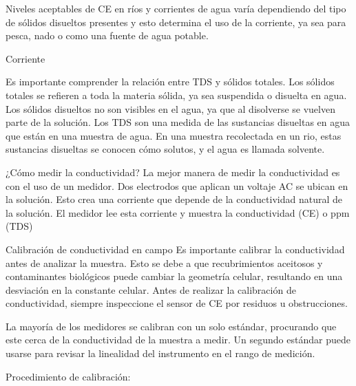 Niveles aceptables de CE en ríos y corrientes de agua varía dependiendo del tipo de sólidos disueltos presentes y esto determina el uso de la corriente, ya sea para pesca, nado o como una fuente de agua potable.


Corriente


Es importante comprender la relación entre TDS y sólidos totales. Los sólidos totales se refieren a toda la materia sólida, ya sea suspendida o disuelta en agua. Los sólidos disueltos no son visibles en el agua, ya que al disolverse se vuelven parte de la solución. Los TDS son una medida de las sustancias disueltas en agua que están en una muestra de agua. En una muestra recolectada en un rio, estas sustancias disueltas se conocen cómo solutos, y el agua es llamada solvente.

¿Cómo medir la conductividad?
La mejor manera de medir la conductividad es con el uso de un medidor. Dos electrodos que aplican un voltaje AC se ubican en la solución. Esto crea una corriente que depende de la conductividad natural de la solución. El medidor lee esta corriente y muestra la conductividad (CE) o ppm (TDS)

Calibración de conductividad en campo
Es importante calibrar la conductividad antes de analizar la muestra. Esto se debe a que recubrimientos aceitosos y contaminantes biológicos puede cambiar la geometría celular, resultando en una desviación en la constante celular. Antes de realizar la calibración de conductividad, siempre inspeccione el sensor de CE por residuos u obstrucciones.

La mayoría de los medidores se calibran con un solo estándar, procurando que este cerca de la conductividad de la muestra a medir. Un segundo estándar puede usarse para revisar la linealidad del instrumento en el rango de medición.

Procedimiento de calibración:

